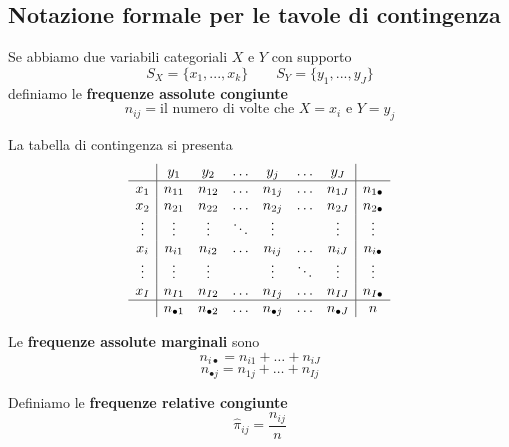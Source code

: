 \documentclass[
  11pt,
]{book}
\theoremstyle{mytheoremstyle}
\theoremstyle{mydefstyle}
\begin{document}
\subsection{Notazione formale per le tavole di contingenza}\label{notazione-formale-per-le-tavole-di-contingenza}

Se abbiamo due variabili categoriali \(X\) e \(Y\) con supporto
\[S_X=\{x_1,...,x_k\} \qquad S_Y= \{y_1,...,y_J\}\] definiamo
le \textbf{frequenze assolute congiunte}
\[n_{ij}=\text{il numero di volte che $X=x_i$ e $Y=y_j$}\]

La tabella di contingenza si presenta
\[
\begin{array}{c|cccccc|c}
 &y_1 &y_2 &\ldots &y_j &\ldots &y_J &\\
  \hline
  x_1 & n_{11} & n_{12} & \ldots &n_{1j} &\ldots &n_{1J} & n_{1\bullet}\\
  x_2 & n_{21} & n_{22} & \ldots &n_{2j} &\ldots &n_{2J} & n_{2\bullet}\\
\vdots& \vdots & \vdots &\ddots &\vdots & &\vdots &\vdots \\
  x_i & n_{i1} & n_{i2} & \ldots &n_{ij} &\ldots & n_{iJ}& n_{i\bullet}\\
\vdots& \vdots & \vdots & &\vdots &\ddots &\vdots &\vdots \\
  x_I & n_{I1} & n_{I2} & \ldots &n_{Ij} &\ldots &n_{IJ} &n_{I\bullet}\\
\hline
   & n_{\bullet 1}& n_{\bullet 2}& \ldots& n_{\bullet j}& \ldots& n_{\bullet J}& n\\ 
\end{array}
\]

Le \textbf{frequenze assolute marginali} sono
\[n_{i \bullet}=n_{i1}+\ldots+n_{iJ}\]
\[n_{\bullet j}=n_{1j}+\ldots+n_{Ij}\]

Definiamo le \textbf{frequenze relative congiunte}
\[\hat\pi_{ij}=\frac{n_{ij}}n\]
\end{document}
